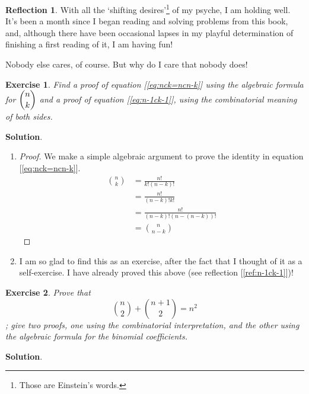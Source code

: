 \documentclass[11pt]{book}
\theoremstyle{definition}
\theoremstyle{plain}
\newtheorem{exercise}{Exercise}
\theoremstyle{definition}
\theoremstyle{problemstyle}
\theoremstyle{remark}
\theoremstyle{definition}
\newtheorem{reflection}{Reflection}
\begin{document}
\begin{reflection}
    With all the `shifting desires'\footnote{Those are Einstein's words.} of my psyche, I am holding well. It's been a month since I began reading and solving problems from this book, and, although there have been occasional lapses in my playful determination of finishing a first reading of it, I am having fun!

    Nobody else cares, of course. But why do I care that nobody does!
\end{reflection}

\begin{exercise}
    Find a proof of equation [\ref{eq:nck=ncn-k}] using the algebraic formula for $\dbinom{n}{k}$ and a proof of equation [\ref{eq:n-1ck-1}], using the combinatorial meaning of both sides.
    \label{ex:1.8.4}
\end{exercise}
\textbf{Solution}.
\begin{enumerate}
\item
    \begin{proof}
        We make a simple algebraic argument to prove the identity in equation [\ref{eq:nck=ncn-k}].
        \begin{align*}
            \binom{n}{k}&=\frac{n!}{k!(n-k)!}\\
                        &=\frac{n!}{(n-k)!k!}\\
                        &=\frac{n!}{(n-k)!(n-(n-k))!}\\
                        &=\binom{n}{n-k}
        \end{align*}
    \end{proof}
\item I am so glad to find this as an exercise, after the fact that I thought of it as a self-exercise. I have already proved this above (see reflection [\ref{ref:n-1ck-1}])!
\end{enumerate}
\begin{exercise}
    Prove that 
    \begin{equation}
        \label{eq:nc2+n+1c2}
        \binom{n}{2}+\binom{n+1}{2}=n^2
    \end{equation}
    ; give two proofs, one using the combinatorial interpretation, and the other using the algebraic formula for the binomial coefficients.
    \label{ex:1.8.5}
\end{exercise}
\textbf{Solution}.
\end{document}
